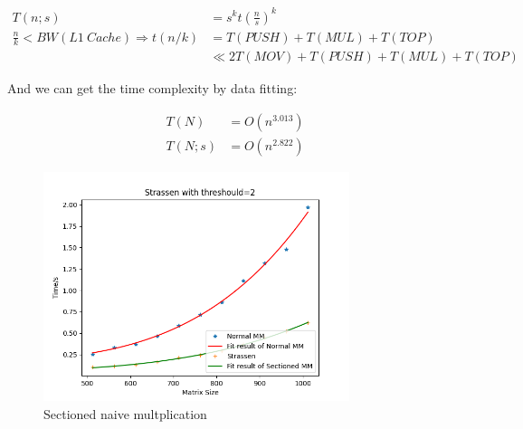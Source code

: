 \documentclass[UTF8]{ctexart}
\begin{document}
\begin{equation}
  \begin{aligned}
    T(n;s)                                          & =s^kt\left(\frac{n}{s}\right)^{k} \\
    \frac{n}{k} <  BW(L1\ Cache) \Rightarrow t(n/k) & =T(PUSH)+T(MUL)+T(TOP)            \\
                                                    & \ll 2T(MOV)+T(PUSH)+T(MUL)+T(TOP)
  \end{aligned}
\end{equation}

And we can get the time complexity by data fitting:

\begin{equation}
  \begin{aligned}
    T(N)   & =O(n^{3.013}) \\
    T(N;s) & =O(n^{2.822})
  \end{aligned}
\end{equation}

\begin{figure}[htb]
  \centering
  \includegraphics[height=6.7cm]{../ppt/slide-UIBK/sub_naive.png}
  \caption{Sectioned naive multplication}
\end{figure}
\end{document}

